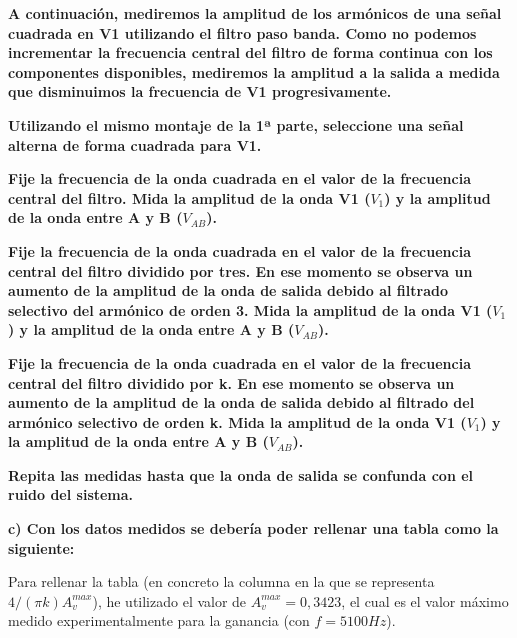 \documentclass{article}
\begin{document}
\bigskip

\textbf{A continuación, mediremos la amplitud de los armónicos de una señal cuadrada en V1
utilizando el filtro paso banda. Como no podemos incrementar la frecuencia central del filtro
de forma continua con los componentes disponibles, mediremos la amplitud a la salida a medida
que disminuimos la frecuencia de V1 progresivamente.}

\textbf{Utilizando el mismo montaje de la 1ª parte, seleccione una señal alterna de forma
cuadrada para V1.}

\textbf{Fije la frecuencia de la onda cuadrada en el valor de la frecuencia central del filtro. Mida
la amplitud de la onda V1 ($V_1$) y la amplitud de la onda entre A y B ($V_{AB}$).}

\textbf{Fije la frecuencia de la onda cuadrada en el valor de la frecuencia central del filtro
dividido por tres. En ese momento se observa un aumento de la amplitud de la onda de salida
debido al filtrado selectivo del armónico de orden 3. Mida la amplitud de la onda V1 ($V_1$) y la
amplitud de la onda entre A y B ($V_{AB}$).}

\textbf{Fije la frecuencia de la onda cuadrada en el valor de la frecuencia central del filtro
dividido por k. En ese momento se observa un aumento de la amplitud de la onda de salida
debido al filtrado del armónico selectivo de orden k. Mida la amplitud de la onda V1 ($V_1$) y la
amplitud de la onda entre A y B ($V_{AB}$).}

\textbf{Repita las medidas hasta que la onda de salida se confunda con el ruido del sistema.}

\textbf{c) Con los datos medidos se debería poder rellenar una tabla como la siguiente:}
\bigskip

Para rellenar la tabla (en concreto la columna en la que se representa $4/(\pi k) A_{v}^{max}$), he utilizado el valor de $A_{v}^{max}=0,3423$, el cual es el valor máximo medido experimentalmente para la ganancia (con $f=5100Hz$).
\end{document}
